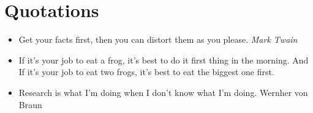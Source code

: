 \section{Quotations}
\begin{itemize}
  \item Get your facts first, then you can distort them as you please. \emph{Mark Twain}
  \item If it's your job to eat a frog, it's best to do it first thing in the morning. And If it's
    your job to eat two frogs, it's best to eat the biggest one first.
  \item
    Research is what I'm doing when I don't know what I'm doing.
    Wernher von Braun
\end{itemize}
